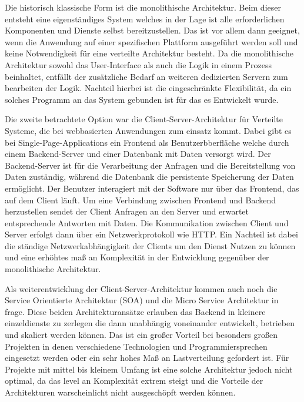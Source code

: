 Die historisch klassische Form ist die monolithische Architektur. Beim dieser entsteht eine eigenständiges System welches in der Lage ist alle erforderlichen Komponenten und Dienste selbst bereitzustellen. Das ist vor allem dann geeignet, wenn die Anwendung auf einer spezifischen Plattform ausgeführt werden soll und keine Notwendigkeit für eine verteilte Architektur besteht. Da die monolithische Architektur sowohl das User-Interface als auch die Logik in einem Prozess beinhaltet, entfällt der zusätzliche Bedarf an weiteren dedizierten Servern zum bearbeiten der Logik. Nachteil hierbei ist die eingeschränkte Flexibilität, da ein solches Programm an das System gebunden ist für das es Entwickelt wurde.

Die zweite betrachtete Option war die Client-Server-Architektur für Verteilte Systeme, die bei webbasierten Anwendungen zum einsatz kommt. Dabei gibt es \zB bei Single-Page-Applications ein Frontend als Benutzerbberfläche welche durch einem Backend-Server und einer Datenbank mit Daten versorgt wird. Der Backend-Server ist für die Verarbeitung der Anfragen und die Bereitstellung von Daten zuständig, während die Datenbank die persistente Speicherung der Daten ermöglicht. Der Benutzer interagiert mit der Software nur über das Frontend, das auf dem Client läuft. Um eine Verbindung zwischen Frontend und Backend herzustellen sendet der Client Anfragen an den Server und erwartet entsprechende Antworten mit Daten. Die Kommunikation zwischen Client und Server erfolgt dann über ein Netzwerkprotokoll wie HTTP. Ein Nachteil ist dabei die ständige Netzwerkabhängigkeit der Clients um den Dienst Nutzen zu können und eine erhöhtes maß an Komplexität in der Entwicklung gegenüber der monolithische Architektur.

Als weiterentwicklung der Client-Server-Architektur kommen auch noch die Service Orientierte Architektur (SOA) und die Micro Service Architektur in frage. Diese beiden Architekturansätze erlauben das Backend in kleinere einzeldienste zu zerlegen die dann unabhängig voneinander entwickelt, betrieben und skaliert werden können. Das ist ein großer Vorteil bei besonders großen Projekten in denen verschiedene Technologien und Programmiersprechen eingesetzt werden oder ein sehr hohes Maß an Lastverteilung gefordert ist. Für Projekte mit mittel bis kleinem Umfang ist eine solche Architektur jedoch nicht optimal, da das level an Komplexität extrem steigt und die Vorteile der Architekturen warscheinlicht nicht ausgeschöpft werden können.

